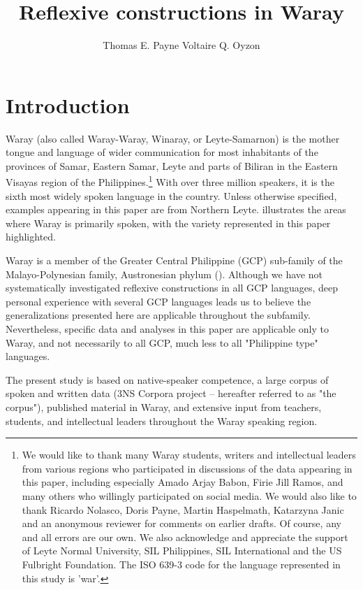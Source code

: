 \documentclass[output=paper]{langscibook}
\author{Thomas E. Payne\affiliation{University of Oregon and SIL International} \lastand Voltaire Q. Oyzon\affiliation{Leyte Normal University}}
\title{Reflexive constructions in Waray}
\begin{document}
\maketitle


\section{Introduction}
\label{sec:Payne:1}
Waray (also called Waray-Waray, Winaray, or Leyte-Samarnon) is the mother tongue and language of wider communication for most inhabitants of the provinces of Samar, Eastern Samar, Leyte and parts of Biliran in the Eastern Visayas region of the Philippines.\footnote{We would like to thank many Waray students, writers and intellectual leaders from various regions who participated in discussions of the data appearing in this paper, including especially Amado Arjay Babon, Firie Jill Ramos, and many others who willingly participated on social media. We would also like to thank Ricardo Nolasco, Doris Payne, Martin Haspelmath, Katarzyna Janic and an anonymous reviewer for comments on earlier drafts. Of course, any and all errors are our own. We also acknowledge and appreciate the support of Leyte Normal University, SIL Philippines, SIL International and the US Fulbright Foundation. The ISO 639-3 code for the language represented in this study is 'war'.}  With over three million speakers, it is the sixth most widely spoken language in the country. Unless otherwise specified, examples appearing in this paper are from Northern Leyte.  illustrates the areas where Waray is primarily spoken, with the variety represented in this paper highlighted.

Waray is a member of the Greater Central Philippine (GCP) sub-family of the Malayo-Polynesian family, Austronesian phylum (\citet{Blust 1991}). Although we have not systematically investigated reflexive constructions in all GCP languages, deep personal experience with several GCP languages leads us to believe the generalizations presented here are applicable throughout the subfamily.
Nevertheless, specific data and analyses in this paper are applicable only to Waray, and not necessarily to all GCP, much less to all "Philippine type" languages.

The present study is based on native-speaker competence, a large corpus of spoken and written data (3NS Corpora project – hereafter referred to as "the corpus"), published material in Waray, and extensive input from teachers, students, and intellectual leaders throughout the Waray speaking region. 
\end{document}
